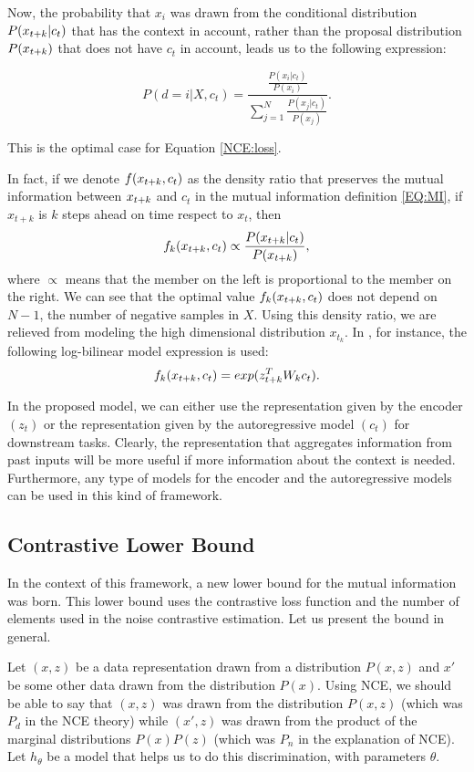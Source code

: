 Now, the probability that $x_i$ was drawn from the conditional distribution $P(x_{t+k}|c_t)$ that has the context in account, rather than the proposal distribution $P(x_{t+k})$ that does not have $c_t$ in account, leads us to the following expression:

$$
P(d = i | X , c_t) = \frac{ \frac{P(x_i|c_t)}{P(x_i)}}{\sum_{j=1}^N \frac{P(x_j|c_t)}{P(x_j)}}.
$$

This is the optimal case for Equation \eqref{NCE:loss}.



In fact, if we denote $f(x_{t+k},c_t)$  as the density ratio that preserves the mutual information between $x_{t+k}$ and $c_t$ in the mutual information definition \eqref{EQ:MI}, if $x_{t+k}$ is $k$ steps ahead on time respect to $x_t$, then
\begin{equation}\label{EQ:Proportional}
f_k(x_{t+k},c_t)  \propto \frac{P(x_{t+k}| c_t)}{P(x_{t+k})},
\end{equation}
where $\propto$ means that the member on the left is proportional to the member on the right. We can see that the optimal value $f_k(x_{t+k},c_t)$ does not depend on $N-1$, the number of negative samples in $X$.
Using this density ratio, we are relieved from modeling the high dimensional distribution $x_{t_k}$. In \cite{oord_representation_2019}, for instance, the following log-bilinear model expression is used:
$$
f_k(x_{t+k},c_t) = exp(z_{t+k}^T W_k c_t).
$$


In the proposed model, we can either use the representation given by the encoder $(z_t)$ or the representation given by the autoregressive model $(c_t)$ for downstream tasks. Clearly, the representation that aggregates information from past inputs will be more useful
if more information about the context is needed. Furthermore, any type of models for the encoder and the autoregressive models can be used in this kind of framework.



\subsection{Contrastive Lower Bound}

In the context of this framework, a new lower bound for the mutual information was born. This lower bound uses the contrastive loss function and the number of elements used in the noise contrastive estimation. Let us present the bound in general.

Let $(x,z)$ be a data representation drawn from a distribution $P(x,z)$ and $x'$ be some other data drawn from the distribution $P(x)$. Using NCE, we should be able to say that $(x,z)$ was drawn from the distribution $P(x,z)$ (which was $P_d$ in the NCE theory) while $(x',z)$ was drawn from the product of the marginal distributions $P(x)P(z)$ (which was $P_n$ in the explanation of NCE). Let $h_\theta$ be a model that helps us to do this discrimination, with parameters $\theta$. 


